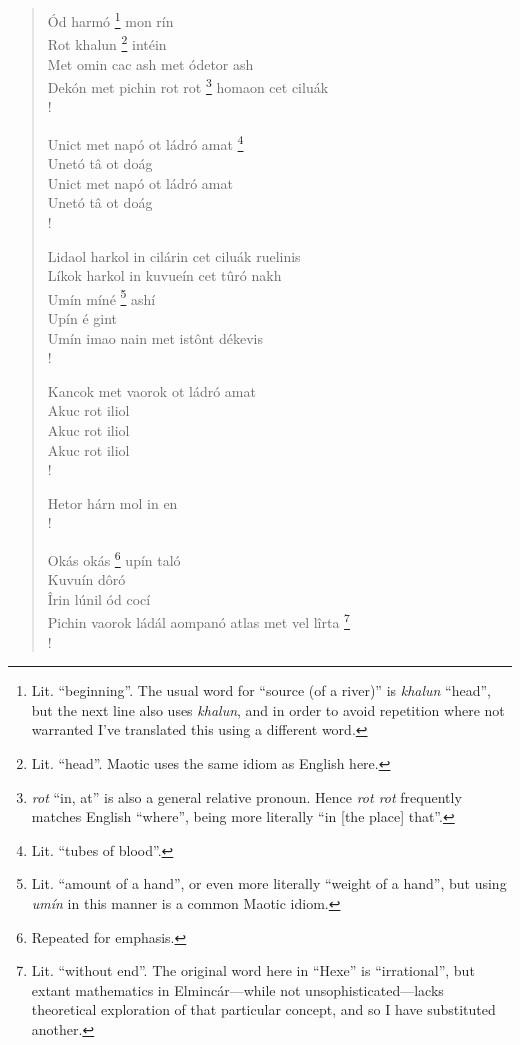\documentclass{article}
\let\oldthefootnote\thefootnote
\newcommand\oocfootnote[2][DarkGreen]{\renewcommand\thefootnote{\color{#1}\oldthefootnote}%
  \footnote{\color{#1}#2}%
  \renewcommand{\thefootnote}{\oldthefootnote}}
\begin{document}
\begin{verse}
Ód harmó\oocfootnote{Lit. ``beginning''. The usual word for ``source (of a river)'' is \emph{khalun} ``head'', but the next line also uses \emph{khalun}, and in order to avoid repetition where not warranted I've translated this using a different word.} mon rín \\
Rot khalun\oocfootnote{Lit. ``head''. Maotic uses the same idiom as English here.} intéin \\
Met omin cac ash met ódetor ash \\

Dekón met pichin rot rot\oocfootnote{\emph{rot} ``in, at'' is also a general relative pronoun. Hence \emph{rot rot} frequently matches English ``where'', being more literally ``in [the place] that''.} homaon cet ciluák \\!

Unict met napó ot ládró amat\oocfootnote{Lit. ``tubes of blood''.} \\
Unetó tâ ot doág \\
Unict met napó ot ládró amat \\
Unetó tâ ot doág \\!

Lidaol harkol in cilárin cet ciluák ruelinis \\
Líkok harkol in kuvueín cet tûró nakh \\
Umín míné\oocfootnote{Lit. ``amount of a hand'', or even more literally ``weight of a hand'', but using \emph{umín} in this manner is a common Maotic idiom.} ashí \\
Upín é gint \\
Umín imao nain met istônt dékevis \\!

Kancok met vaorok ot ládró amat \\
Akuc rot iliol \\
Akuc rot iliol \\
Akuc rot iliol \\!

Hetor hárn mol in en \\!

Okás okás\oocfootnote{Repeated for emphasis.} upín taló \\
Kuvuín dôró \\
Îrin lúnil ód cocí \\
Pichin vaorok ládál aompanó atlas met vel lîrta\oocfootnote{Lit. ``without end''. The original word here in ``Hexe'' is ``irrational'', but extant mathematics in Elmincár—while not unsophisticated—lacks theoretical exploration of that particular concept, and so I have substituted another.} \\!


\end{verse}
\end{document}
